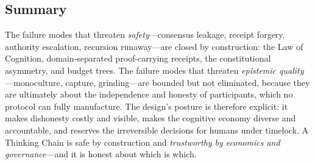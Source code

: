 \subsection{Summary}

The failure modes that threaten \emph{safety}---consensus leakage, receipt forgery, authority escalation, recursion runaway---are closed by construction: the Law of Cognition, domain-separated proof-carrying receipts, the constitutional asymmetry, and budget trees. The failure modes that threaten \emph{epistemic quality}---monoculture, capture, grinding---are bounded but not eliminated, because they are ultimately about the independence and honesty of participants, which no protocol can fully manufacture. The design's posture is therefore explicit: it makes dishonesty costly and visible, makes the cognitive economy diverse and accountable, and reserves the irreversible decisions for humans under timelock. A Thinking Chain is safe by construction and \emph{trustworthy by economics and governance}---and it is honest about which is which.

